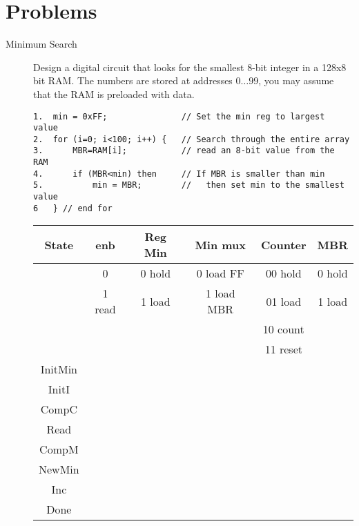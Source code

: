 \section{Problems}
\begin{description}


\item[Minimum Search]

Design a digital circuit that looks for the smallest 
8-bit integer in a 128x8 bit RAM.  The numbers
are stored at addresses $0\ldots 99$, you may assume that the 
RAM is preloaded with data.

\begin{verbatim}
1.  min = 0xFF;               // Set the min reg to largest value
2.  for (i=0; i<100; i++) {   // Search through the entire array
3.      MBR=RAM[i];           // read an 8-bit value from the RAM
4.      if (MBR<min) then     // If MBR is smaller than min
5.          min = MBR;        //   then set min to the smallest value
6   } // end for
\end{verbatim}




\begin{tabular}{c||c|c|c|c|c}  
State   & enb       &  Reg Min  & Min mux       & Counter & MBR	\\ \hline
        & 0     &  0 hold   & 0 load FF     & 00 hold & 0 hold	\\ \hline
        & 1 read  &  1 load   & 1 load MBR    & 01 load & 1 load	\\ \hline
        &                 &           &               & 10 count& 		\\ \hline
        &                &           &               & 11 reset& \\ \hline \hline
InitMin &            &          &              &       &    \\ \hline
InitI   &              &          &              &       &    \\ \hline
CompC   &             &          &              &       &    \\ \hline
Read    &             &          &              &       &    \\ \hline
CompM   &           &          &              &       &    \\ \hline
NewMin  &             &          &              &       &    \\ \hline
Inc     &             &          &              &       &    \\ \hline
Done    &             &          &              &       &    \\ 
\end{tabular}


\end{description}
